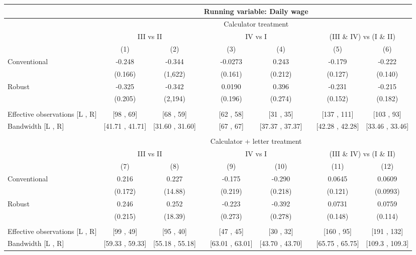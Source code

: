 \begin{tabular}{lcccccccc}
\toprule
      & \multicolumn{8}{c}{Running variable: Daily wage} \\
\midrule
      & \multicolumn{8}{c}{Calculator treatment} \\
\midrule
      & \multicolumn{2}{c}{III vs II} &       & \multicolumn{2}{c}{IV vs I} &       & \multicolumn{2}{c}{(III \& IV) vs (I \& II)} \\
\cmidrule{2-3}\cmidrule{5-6}\cmidrule{8-9}      & (1)   & (2)   &       & (3)   & (4)   &       & (5)   & (6) \\
\midrule
\midrule
Conventional & -0.248 & -0.344 &       & -0.0273 & 0.243 &       & -0.179 & -0.222 \\
      & (0.166) & (1,622) &       & (0.161) & (0.212) &       & (0.127) & (0.140) \\
Robust & -0.325 & -0.342 &       & 0.0190 & 0.396 &       & -0.231 & -0.215 \\
      & (0.205) & (2,194) &       & (0.196) & (0.274) &       & (0.152) & (0.182) \\
      &       &       &       &       &       &       &       &  \\
\midrule
Effective observations [L , R] & [98 ,  69] & [68 ,  59] &       & [62 ,  58] & [31 ,  35] &       & [137 ,  111] & [103 ,  93] \\
Bandwidth [L , R] & [41.71 ,  41.71] & [31.60 ,  31.60] &       & [67 ,  67] & [37.37 ,  37.37] &       & [42.28 ,  42.28] & [33.46 ,  33.46] \\
\midrule
\midrule
      &       &       &       &       &       &       &       &  \\
\midrule
      & \multicolumn{8}{c}{Calculator + letter treatment} \\
\midrule
      & \multicolumn{2}{c}{III vs II} &       & \multicolumn{2}{c}{IV vs I} &       & \multicolumn{2}{c}{(III \& IV) vs (I \& II)} \\
\cmidrule{2-3}\cmidrule{5-6}\cmidrule{8-9}      & (7)   & (8)   &       & (9)   & (10)  &       & (11)  & (12) \\
\midrule
\midrule
Conventional & 0.216 & 0.227 &       & -0.175 & -0.290 &       & 0.0645 & 0.0609 \\
      & (0.172) & (14.88) &       & (0.219) & (0.218) &       & (0.121) & (0.0993) \\
Robust & 0.246 & 0.252 &       & -0.223 & -0.392 &       & 0.0731 & 0.0759 \\
      & (0.215) & (18.39) &       & (0.273) & (0.278) &       & (0.148) & (0.114) \\
      &       &       &       &       &       &       &       &  \\
\midrule
Effective observations [L , R] & [99 ,  49] & [95 ,  40] &       & [47 ,  45] & [30 ,  32] &       & [160 ,  95] & [191 ,  132] \\
Bandwidth [L , R] & [59.33 ,  59.33] & [55.18 ,  55.18] &       & [63.01 ,  63.01] & [43.70 ,  43.70] &       & [65.75 ,  65.75] & [109.3 ,  109.3] \\
\bottomrule
\bottomrule
\end{tabular}%
